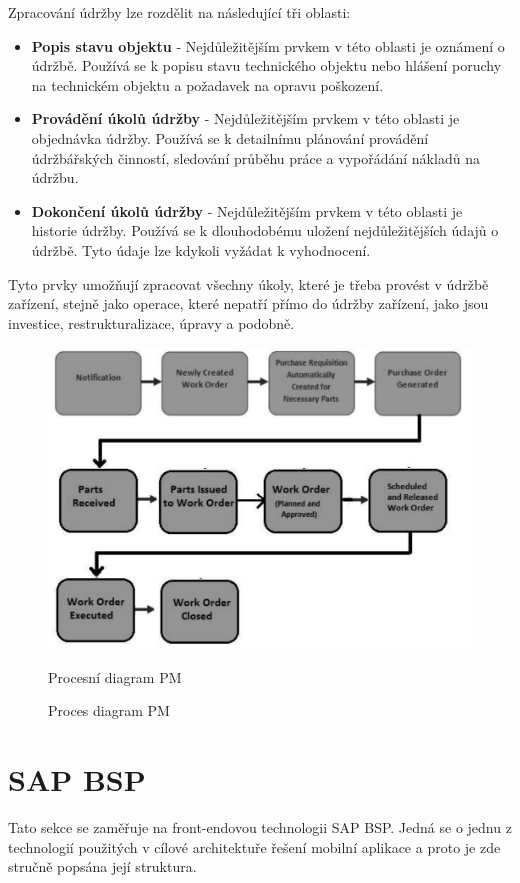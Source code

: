 \documentclass[thesis=M,czech]{FITthesis}[2012/06/26]
\begin{document}
Zpracování údržby lze rozdělit na následující tři oblasti:
\begin{itemize}
	\item
	\textbf{Popis stavu objektu} - Nejdůležitějším prvkem v této oblasti je oznámení o údržbě. Používá se k popisu stavu technického objektu nebo hlášení poruchy na technickém objektu a požadavek na opravu poškození.
	\item
	\textbf{Provádění úkolů údržby} - Nejdůležitějším prvkem v této oblasti je objednávka údržby. Používá se k detailnímu plánování provádění údržbářských činností, sledování průběhu práce a vypořádání nákladů na údržbu.
	\item
	\textbf{Dokončení úkolů údržby} - Nejdůležitějším prvkem v této oblasti je historie údržby. Používá se k dlouhodobému uložení nejdůležitějších údajů o údržbě. Tyto údaje lze kdykoli vyžádat k vyhodnocení.
\end{itemize} 

Tyto prvky umožňují zpracovat všechny úkoly, které je třeba provést v údržbě zařízení, stejně jako operace, které nepatří přímo do údržby zařízení, jako jsou investice, restrukturalizace, úpravy a podobně.

\begin{figure}[H]
	\centering
	\includegraphics[width=1\textwidth]{images/pm_process.jpg}
	\caption{Proces diagram PM}
	\label{img:pm_process}
	\small
	Procesní diagram PM
\end{figure}

\section{SAP BSP}
Tato sekce se zaměřuje na front-endovou technologii SAP BSP. Jedná se o jednu z technologií použitých v cílové architektuře řešení mobilní aplikace a proto je zde stručně popsána její struktura.
\end{document}
